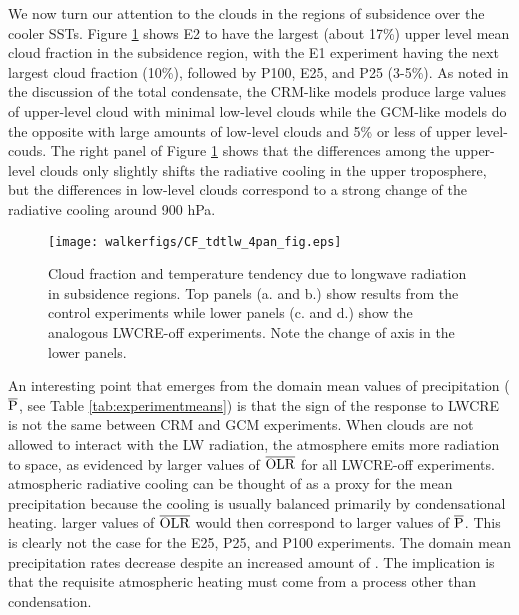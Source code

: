 \documentclass[draft]{agujournal2019}
\begin{document}
{We now turn our attention to the clouds in the regions of subsidence over the cooler SSTs.
Figure \ref{fig:cf_tdtlw} shows E2 to have the largest (about 17\%) upper level mean cloud
fraction in the subsidence region, with the E1 experiment having the next largest cloud fraction (10\%), followed by 
P100, E25, and P25 (3-5\%).  As noted in the discussion of the total condensate, the CRM-like models 
produce large values of upper-level cloud with minimal low-level clouds while the GCM-like models
do the opposite with large amounts of low-level clouds and 5\% or less of upper level-couds.   
The right panel of Figure \ref{fig:cf_tdtlw} shows that the differences among the upper-level clouds only slightly shifts the radiative cooling in the
upper troposphere, but the differences in low-level clouds correspond to a strong change of the radiative cooling around 900 hPa. 

\begin{figure}
  \centering
      \texttt{[image: walkerfigs/CF\_tdtlw\_4pan\_fig.eps]}
  \caption{Cloud fraction and temperature tendency due to longwave radiation in subsidence regions.  
  Top panels (a. and b.) show results from the control experiments while lower panels (c. and d.) show the
  analogous LWCRE-off experiments.  Note the change of axis in the lower panels.}
  \label{fig:cf_tdtlw}
\end{figure}

An interesting point that emerges from the domain mean values of precipitation ($\overline{\rm{P}}$, see Table \ref{tab:experimentmeans}) 
is that the sign of the response to LWCRE is not the same between CRM and GCM experiments.
When clouds are not allowed to interact with the LW radiation, the atmosphere 
emits more radiation to space, as evidenced by larger values of $\overline{\rm{OLR}}$ 
for all LWCRE-off experiments.   atmospheric radiative cooling can be thought of 
as a proxy for the mean precipitation because the cooling is usually balanced primarily by 
condensational heating.  larger values of $\overline{\rm{OLR}}$ would then correspond to 
larger values of $\overline{\rm{P}}$.  This is clearly not the case for the E25, P25, and 
P100 experiments.   The domain mean precipitation rates decrease despite an increased 
amount of .  The implication is that the requisite atmospheric heating 
must come from a process other than condensation.  

}
\end{document}

